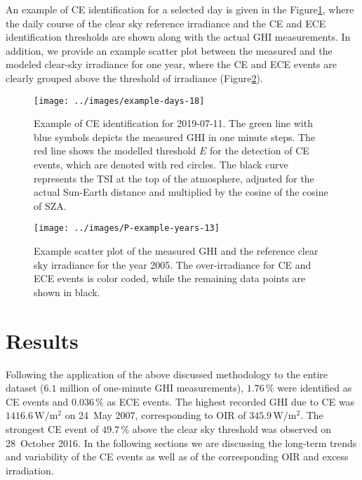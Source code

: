 \documentclass[preprint, 5p,
authoryear]{elsarticle} %
\begin{document}
An example of CE identification for a selected day is given in the
Figure\nobreakspace{}\ref{fig:example-day}, where the daily course of
the clear sky reference irradiance and the CE and ECE identification
thresholds are shown along with the actual GHI measurements. In
addition, we provide an example scatter plot between the measured and
the modeled clear-sky irradiance for one year, where the CE and ECE
events are clearly grouped above the threshold of irradiance
(Figure\nobreakspace{}\ref{fig:example-year}).

\begin{figure}[H]

{\centering \texttt{[image: ../images/example-days-18]} 

}

\caption{Example of CE identification for 2019-07-11. The green line with blue symbols depicts the measured GHI in one minute steps. The red line shows the modelled threshold $E$ for the detection of CE events, which are denoted with red circles. The black curve represents the TSI at the top of the atmosphere, adjusted for the actual Sun-Earth distance and multiplied by the cosine of the cosine of SZA.}\label{fig:example-day}
\end{figure}

\begin{figure}[H]

{\centering \texttt{[image: ../images/P-example-years-13]} 

}

\caption{Example scatter plot of the measured GHI and the reference clear sky irradiance for the year 2005. The over-irradiance for CE and ECE events is color coded, while the remaining data points are shown in black.}\label{fig:example-year}
\end{figure}

\section{Results}\label{results}

Following the application of the above discussed methodology to the
entire dataset (\(6.1\) million of one-minute GHI measurements),
\(1.76\,\%\) were identified as CE events and \(0.036\,\%\) as ECE
events. The highest recorded GHI due to CE was
\(1416.6\,\text{W}/\text{m}^2\) on 24~May 2007, corresponding to OIR of
\(345.9\,\text{W}/\text{m}^2\). The strongest CE event of \(49.7\,\%\)
above the clear sky threshold was observed on 28~October 2016. In the
following sections we are discussing the long-term trends and
variability of the CE events as well as of the corresponding OIR and
excess irradiation.
\end{document}
